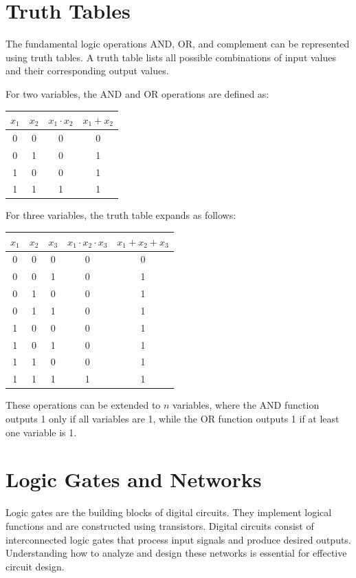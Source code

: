 \documentclass[twocolumn]{article}
\begin{document}
\section{Truth Tables}
The fundamental logic operations AND, OR, and complement can be represented using truth tables. A truth table lists all possible combinations of input values and their corresponding output values.

For two variables, the AND and OR operations are defined as:
\begin{center}
    \begin{tabular}{|c|c||c|c|}
    \hline
    $x_1$ & $x_2$ & $x_1 \cdot x_2$ & $x_1 + x_2$ \\
    \hline
    0 & 0 & 0 & 0 \\
    0 & 1 & 0 & 1 \\
    1 & 0 & 0 & 1 \\
    1 & 1 & 1 & 1 \\
    \hline
    \end{tabular}
\end{center}

For three variables, the truth table expands as follows:
\begin{center}
    \begin{tabular}{|c|c|c||c|c|}
    \hline
    $x_1$ & $x_2$ & $x_3$ & $x_1 \cdot x_2 \cdot x_3$ & $x_1 + x_2 + x_3$ \\
    \hline
    0 & 0 & 0 & 0 & 0 \\
    0 & 0 & 1 & 0 & 1 \\
    0 & 1 & 0 & 0 & 1 \\
    0 & 1 & 1 & 0 & 1 \\
    1 & 0 & 0 & 0 & 1 \\
    1 & 0 & 1 & 0 & 1 \\
    1 & 1 & 0 & 0 & 1 \\
    1 & 1 & 1 & 1 & 1 \\
    \hline
    \end{tabular}
\end{center}

These operations can be extended to $n$ variables, where the AND function outputs 1 only if all variables are 1, while the OR function outputs 1 if at least one variable is 1.


\section{Logic Gates and Networks}
Logic gates are the building blocks of digital circuits. They implement logical functions and are constructed using transistors. Digital circuits consist of interconnected logic gates that process input signals and produce desired outputs. Understanding how to analyze and design these networks is essential for effective circuit design.
\end{document}
